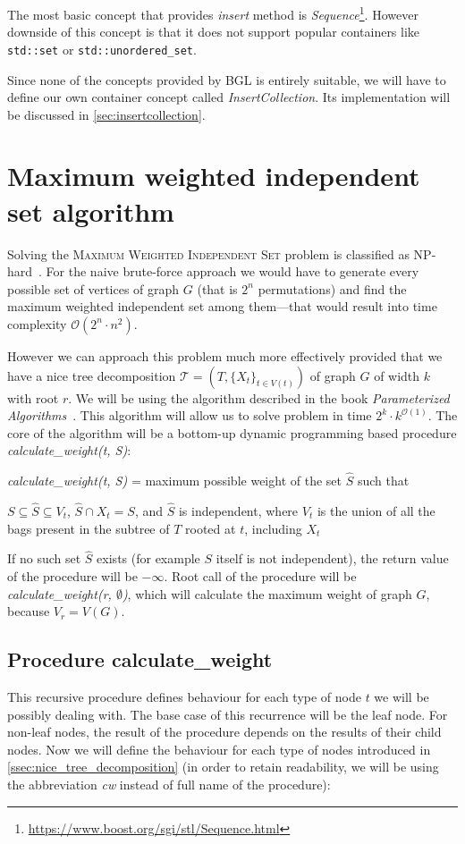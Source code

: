 \documentclass[thesis=B,english]{FITthesis}[2019/03/21]
\begin{document}
The most basic concept that provides \emph{insert} method is \emph{Sequence}\footnote{\url{https://www.boost.org/sgi/stl/Sequence.html}}. However downside of this concept is that it does not support popular containers like \texttt{std::set} or \texttt{std::unordered\_set}.

Since none of the concepts provided by BGL is entirely suitable, we will have to define our own container concept called \emph{InsertCollection}. Its implementation will be discussed in \autoref{sec:insertcollection}.

\section{Maximum weighted independent set algorithm}\label{sec:wis}
Solving the \textsc{Maximum Weighted Independent Set} problem is classified as NP-hard~\cite{mwis_np}. For the naive brute-force approach we would have to generate every possible set of vertices of graph $G$ (that is $2^n$ permutations) and find the maximum weighted independent set among them---that would result into time complexity $\mathcal{O}(2^n \cdot n^2)$.

However we can approach this problem much more effectively provided that we have a nice tree decomposition $\mathcal{T} = (T, \{X_t\}_{t \in V(t)})$ of graph $G$ of width $k$ with root $r$. We will be using the algorithm described in the book \emph{Parameterized Algorithms}~\cite[Chap. 7.3.1]{param_algo}. This algorithm will allow us to solve problem in time $2^k \cdot k^{\mathcal{O}(1)}$. The core of the algorithm will be a bottom-up dynamic programming based procedure \emph{calculate\_weight(t, S)}:

\begin{center}
\centering
\emph{calculate\_weight(t, S)} = maximum possible weight of the set $\widehat{S}$ such that

$S \subseteq \widehat{S} \subseteq V_t$, $\widehat{S} \cap X_t = S$, and $\widehat{S}$ is independent, where $V_t$ is the union of all the bags present in the subtree of $T$ rooted at $t$, including $X_t$
\end{center}

If no such set $\widehat{S}$ exists (for example $S$ itself is not independent), the return value of the procedure will be $-\infty$. Root call of the procedure will be \emph{calculate\_weight(r, $\emptyset$)}, which will calculate the maximum weight of graph $G$, because $V_r = V(G)$.

\subsection{Procedure calculate\_weight}\label{ssec:mwis_calculate_weight}
This recursive procedure defines behaviour for each type of node $t$ we will be possibly dealing with. The base case of this recurrence will be the leaf node. For  non-leaf nodes, the result of the procedure depends on the results of their child nodes. Now we will define the behaviour for each type of nodes introduced in \autoref{ssec:nice_tree_decomposition} (in order to retain readability, we will be using the abbreviation \emph{cw} instead of full name of the procedure):\bigskip
\end{document}
